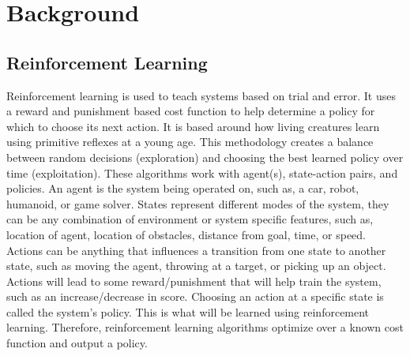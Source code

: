 \documentclass[12pt,american]{report}
\begin{document}
\chapter{Background}
\label{sec:background}

\section{Reinforcement Learning}
Reinforcement learning is used to teach systems based on trial and error.  It uses a reward and punishment based cost function to help determine a policy for which to choose its next action.  It is based around how living creatures learn using primitive reflexes at a young age. This methodology creates a balance between random decisions (exploration) and choosing the best learned policy over time (exploitation). These algorithms work with agent(s), state-action pairs, and policies. An agent is the system being operated on, such as, a car, robot, humanoid, or game solver. States represent different modes of the system, they can be any combination of environment or system specific features, such as, location of agent, location of obstacles, distance from goal, time, or speed. Actions can be anything that influences a transition from one state to another state, such as moving the agent, throwing at a target, or picking up an object.  Actions will lead to some reward/punishment that will help train the system, such as an increase/decrease in score.  Choosing an action at a specific state is called the system's policy. This is what will be learned using reinforcement learning.  Therefore, reinforcement learning algorithms optimize over a known cost function and output a policy.
		    
\end{document}
